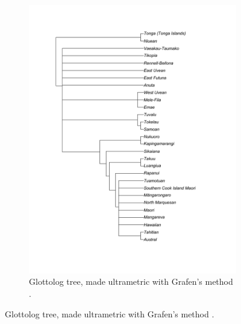 \documentclass[12pt,letterpaper]{article}
\begin{document}
\begin{figure}[ht]
\begin{subfigure}{0.3\linewidth}
          \includegraphics[width=\textwidth]{illustrations/plots_from_R/tree_plots/poly_tree_example_brlen_glottolog_grafen.png}
     \caption{Glottolog tree, made ultrametric with Grafen's method \citep{grafen1989phylogenetic}.}
      \label{glottolog_example_poly_grafen}
    \end{subfigure}


\end{figure}
\end{document}
